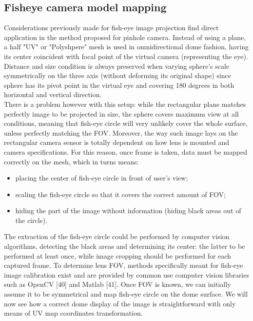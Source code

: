 \subsection{Fisheye camera model mapping}
Considerations previously made for fish-eye image projection find direct application in the method proposed for pinhole camera. Instead of using a plane, a half "UV" or "Polyshpere" mesh is used in omnidirectional dome fashion, having its center coincident with focal point of the virtual camera (representing the eye). Distance and size condition is always preserved when varying sphere's scale symmetrically on the three axis (without deforming its original shape) since sphere has its pivot point in the virtual eye and covering 180 degrees in both horizontal and vertical direction.\\
There is a problem however with this setup: while the rectangular plane matches perfectly image to be projected in size, the sphere covers maximum view at all conditions, meaning that fish-eye circle will very unlikely cover the whole surface, unless perfectly matching the FOV. Moreover, the way such image lays on the rectangular camera sensor is totally dependent on how lens is mounted and camera specifications. For this reason, once frame is taken, data must be mapped correctly on the mesh, which in turns means:
\begin{itemize}
\item placing the center of fish-eye circle in front of user's view;
\item scaling the fish-eye circle so that it covers the correct amount of FOV;
\item hiding the part of the image without information (hiding black areas out of the circle).
\end{itemize}
The extraction of the fish-eye circle could be performed by computer vision algorithms, detecting the black areas and determining its center: the latter to be performed at least once, while image cropping should be performed for each captured frame. To determine lens FOV, methods specifically meant for fish-eye image calibration exist and are provided by common use computer vision libraries such as OpenCV [40] and Matlab [41]. Once FOV is known, we can initially assume it to be symmetrical and map fish-eye circle on the dome surface. We will now see how a correct dome display of the image is straightforward with only means of UV map coordinates transformation.\\

